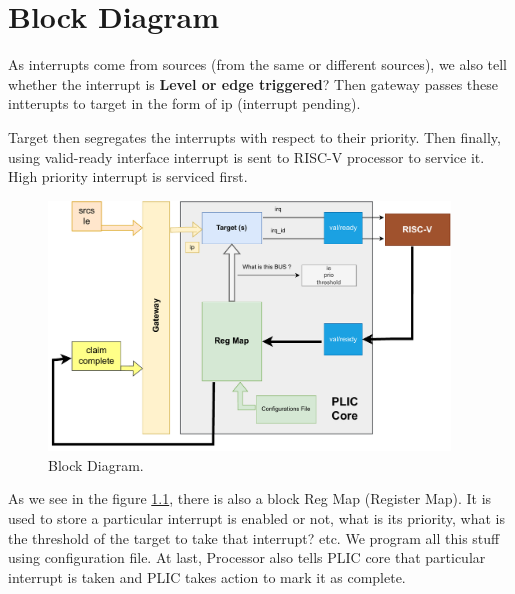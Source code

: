 
\chapter{Block Diagram}
\label{Chapter7}

As interrupts come from sources (from the same or different sources), we also tell whether the interrupt is \textbf{ Level or edge triggered}? Then gateway passes these intterupts to target in the form of ip (interrupt  pending).

\par
Target then segregates the interrupts with respect to their priority. Then finally, using valid-ready interface  interrupt is sent to RISC-V processor to service it. High priority interrupt is serviced first.

\begin{figure}[h]
  \centering
  \includegraphics[width=0.95\textwidth]{./Figures/block_diagram.pdf}
  \caption{Block Diagram.}
  \label{fig:block_diagram}
\end{figure}


As we see in the figure \ref{fig:block_diagram}, there is also a block Reg Map (Register Map). It is used to store a particular interrupt is enabled or not, what is its priority, what is the threshold of the target to take that interrupt? etc. We program all this stuff using configuration file. At last, Processor also tells PLIC core that particular interrupt is taken and PLIC takes action to mark it as complete. 
